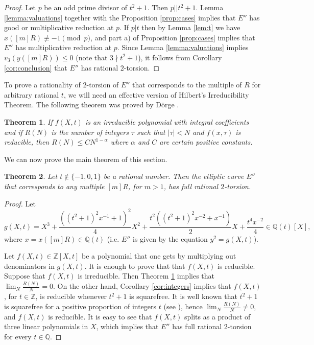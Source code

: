 \documentclass[11pt]{amsart}
\theoremstyle{plain}
\newtheorem{theorem}{Theorem}
\theoremstyle{remark}
\begin{document}
\begin{proof}
Let $p$ be an odd prime divisor of $t^2+1$. Then $p||t^2+1$. Lemma \ref{lemma:valuations} together with the Proposition \ref{prop:cases} implies that $E''$ has good or multiplicative reduction at $p$. If $p|t$ then by Lemma \ref{lem:t} we have $x([m]R)\not \equiv -1 \pmod{p}$, and part a) of Proposition \ref{prop:cases} implies that $E''$ has multiplicative reduction at $p$. Since Lemma \ref{lemma:valuations} implies $v_3(y([m]R))\le 0$  (note that $3\nmid t^2+1$), it follows from Corollary \ref{cor:conclusion} that $E''$ has rational $2$-torsion.
\end{proof}

To prove a rationality of $2$-torsion of $E''$ that corresponds to the multiple of $R$ for arbitrary rational $t$, we will need an effective version of Hilbert's Irreducibility Theorem. The following theorem was proved by D\"orge \cite{Do}.

\begin{theorem}
\label{thm:Hilbert}
If $f(X,t)$ is an irreducible polynomial with integral coefficients and if $R(N)$ is the number of integers $\tau$ such that $|\tau|<N$ and $f(x,\tau)$ is reducible, then $R(N)\le C N^{1-\alpha}$ where $\alpha$ and $C$ are certain positive constants.
\end{theorem}

We can now prove the main theorem of this section.

\begin{theorem}
\label{thm:all}
Let $t \notin \{-1,0,1\}$ be a rational number. Then the elliptic curve $E''$ that corresponds to any multiple  $[m]R$, for $m>1$, has full rational $2$-torsion.
\end{theorem}

\begin{proof}
Let
$$
g(X,t)=X^3+\frac{((t^2+1)^2x^{-1}+1)^2}{4}X^2+\frac{t^2((t^2+1)^2x^{-2}+x^{-1})}{2} X + \frac{t^4x^{-2}}{4}\in \mathbb{Q}(t)[X],
$$
where $x= x([m]R)\in \mathbb{Q}(t)$ (i.e. $E''$ is given by the equation $y^2=g(X,t)$).

Let $f(X,t)\in \mathbb{Z}[X,t]$ be a polynomial that one gets by multiplying out denominators in $g(X,t)$. It is enough to prove that that $f(X,t)$ is reducible. Suppose that $f(X,t)$ is irreducible. Then Theorem \ref{thm:Hilbert} implies that $\lim_N \frac{R(N)}{N}=0$. On the other hand, Corollary \ref{cor:integers} implies that $f(X,t)$, for $t\in \mathbb{Z}$, is reducible whenever $t^2+1$ is squarefree. It is well known that $t^2+1$ is squarefree for a positive proportion of integers $t$ (see \cite{E}), hence $\lim_N \frac{R(N)}{N} \ne 0$, and $f(X,t)$ is reducible. It is easy to see that $f(X,t)$ splits as a product of three linear polynomials in $X$, which implies that $E''$ has full rational $2$-torsion for every $t\in \mathbb{Q}$.
\end{proof}
\end{document}
